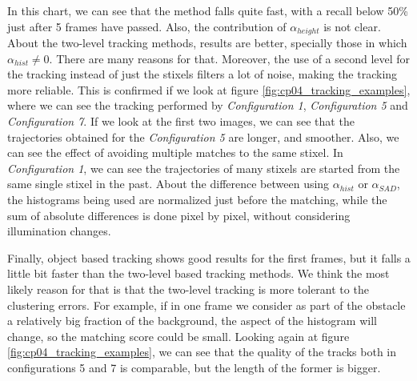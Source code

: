 In this chart, we can see that the \cite{gunyel2012stixels} method falls quite fast, with a recall below 50\% just after 5 frames have passed. Also, the contribution of $\alpha_{height}$ is not clear. About the two-level tracking methods, results are better, specially those in which $\alpha_{hist} \neq 0$. There are many reasons for that. Moreover, the use of a second level for the tracking instead of just the stixels filters a lot of noise, making the tracking more reliable. This is confirmed if we look at figure \ref{fig:cp04_tracking_examples}, where we can see the tracking performed by \emph{Configuration 1}, \emph{Configuration 5} and \emph{Configuration 7}. If we look at the first two images, we can see that the trajectories obtained for the \emph{Configuration 5} are longer, and smoother. Also, we can see the effect of avoiding multiple matches to the same stixel. In \emph{Configuration 1}, we can see the trajectories of many stixels are started from the same single stixel in the past. About the difference between using $\alpha_{hist}$ or $\alpha_{SAD}$, the histograms being used are normalized just before the matching, while the sum of absolute differences is done pixel by pixel, without considering illumination changes.

Finally, object based tracking shows good results for the first frames, but it falls a little bit faster than the two-level based tracking methods. We think the most likely reason for that is that the two-level tracking is more tolerant to the clustering errors. For example, if in one frame we consider as part of the obstacle a relatively big fraction of the background, the aspect of the histogram will change, so the matching score could be small. Looking again at figure \ref{fig:cp04_tracking_examples}, we can see that the quality of the tracks both in configurations 5 and 7 is comparable, but the length of the former is bigger.

